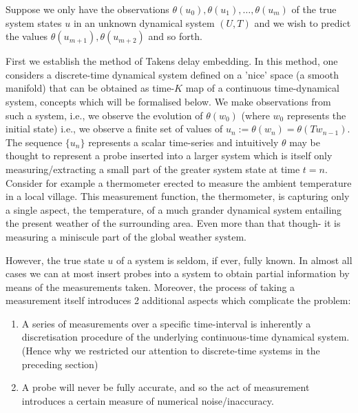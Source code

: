 \documentclass[a4paper,12pt,twoside]{report}
\begin{document}
Suppose we only have the observations $\theta(u_0), \theta(u_1), \ldots, \theta(u_m)$ of the true system states $u$ in an unknown dynamical system $(U,T)$ and we wish to predict the values $\theta(u_{m+1}), \theta(u_{m+2})$ and so forth.

First we establish the method of Takens delay embedding. 
In this method, one considers a discrete-time dynamical system defined on a 'nice' space (a smooth manifold) that can be obtained as time-$K$ map of a continuous time-dynamical system, concepts which will be formalised below.
We make observations from such a system, i.e., we observe the evolution of $\theta(w_0)$ (where $w_0$ represents the initial state) i.e., we observe  a finite set of values of $u_n :=  \theta(w_n) = \theta(Tw_{n-1})$. The sequence $\{u_n\}$ represents a scalar time-series and intuitively $\theta$ may be thought to represent a probe inserted into a larger system which is itself only measuring/extracting a small part of the greater system state at time $t=n$. 
Consider for example a thermometer erected to measure the ambient temperature in a local village. This measurement function, the thermometer, is capturing only a single aspect, the temperature, of a much grander dynamical system entailing the present weather of the surrounding area. Even more than that though- it is measuring a miniscule part of the global weather system. 



However, the true state $u$ of a system is seldom, if ever, fully known. In almost all cases we can at most insert probes into a system to obtain partial information by means of the measurements taken. Moreover, the process of taking a measurement itself introduces 2 additional aspects which complicate the problem: 
\vspace{-8mm}
\begin{enumerate}[noitemsep, label=\roman*.]
  \item A series of measurements over a specific time-interval is inherently a discretisation procedure of the underlying continuous-time dynamical system. (Hence why we restricted our attention to discrete-time systems in the preceding section)
  \item A probe will never be fully accurate, and so the act of measurement introduces a certain measure of numerical noise/inaccuracy.
\end{enumerate}
\end{document}
